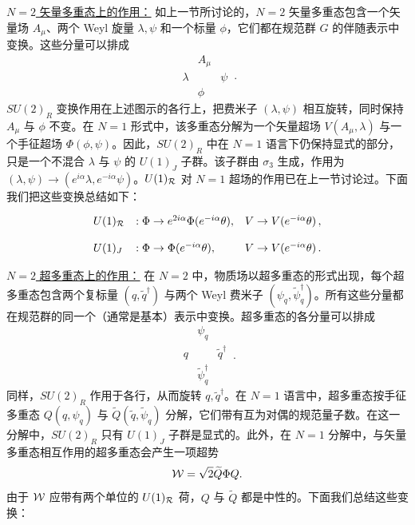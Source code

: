 \noindent\underline{$N=2$ 矢量多重态上的作用：}
如上一节所讨论的，$N=2$ 矢量多重态包含一个矢量场 $A_\mu$、两个 Weyl 旋量 $\lambda, \psi$ 和一个标量 $\phi$，它们都在规范群 $G$ 的伴随表示中变换。这些分量可以排成
$$
\begin{array}{ccc}
 & A_\mu & \\
 \lambda & & \psi \\
 & \phi &
\end{array}\,.
$$
$SU(2)_R$ 变换作用在上述图示的各行上，把费米子 $(\lambda,\psi)$ 相互旋转，同时保持 $A_\mu$ 与 $\phi$ 不变。在 $N=1$ 形式中，该多重态分解为一个矢量超场 $V(A_\mu, \lambda)$ 与一个手征超场 $\Phi(\phi,\psi)$。因此，$SU(2)_R$ 中在 $N=1$ 语言下仍保持显式的部分，只是一个不混合 $\lambda$ 与 $\psi$ 的 $U(1)_J$ 子群。该子群由 $\sigma_3$ 生成，作用为 $(\lambda,\psi)\rightarrow(e^{i\alpha}\lambda,e^{-i\alpha}\psi)$。$U(1)_{\cal R}$ 对 $N=1$ 超场的作用已在上一节讨论过。下面我们把这些变换总结如下：

\begin{equation}
\begin{array}{lll}
U(1)_{\cal R} &: \Phi\rightarrow e^{2i\alpha}\Phi(e^{-i\alpha}\theta),
&V\rightarrow V(e^{-i\alpha}\theta)\,,
\\ \\
U(1)_J &: \Phi \rightarrow \Phi (e^{-i\alpha}\theta), &
V\rightarrow V(e^{-i\alpha}\theta)\,.
\end{array}
\label{Rb1}
\end{equation}

\noindent\underline{$N=2$ 超多重态上的作用：}
在 $N=2$ 中，物质场以超多重态的形式出现，每个超多重态包含两个复标量 $(q,\widetilde q^\dagger)$ 与两个 Weyl 费米子 $(\psi_q,\widetilde\psi^\dagger_q)$。所有这些分量都在规范群的同一个（通常是基本）表示中变换。超多重态的各分量可以排成
$$
\begin{array}{ccc}
 & \psi_q & \\
 q & & \widetilde q^\dagger \\
 & \widetilde\psi_q^\dagger &
\end{array}\,. 
$$
同样，$SU(2)_R$ 作用于各行，从而旋转 $q,\widetilde q^\dagger$。在 $N=1$ 语言中，超多重态按手征多重态 $Q(q,\psi_q)$ 与 $\widetilde Q(\widetilde q,\widetilde\psi_q)$ 分解，它们带有互为对偶的规范量子数。在这一分解中，$SU(2)_R$ 只有 $U(1)_J$ 子群是显式的。此外，在 $N=1$ 分解中，与矢量多重态相互作用的超多重态会产生一项超势
$$
{\cal W} = \sqrt{2} \widetilde Q \Phi Q.
$$
由于 ${\cal W}$ 应带有两个单位的 $U(1)_{\cal R}$ 荷，$Q$ 与 $\widetilde Q$ 都是中性的。下面我们总结这些变换：

